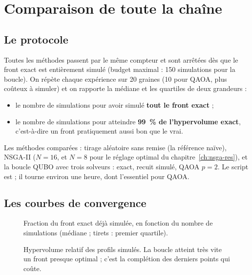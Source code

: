 \chapter{Comparaison de toute la chaîne}\label{ch:comparaison}

\section{Le protocole}
Toutes les méthodes passent par le même compteur et sont arrêtées dès que le front exact est entièrement simulé (budget maximal : 150 simulations pour la boucle). On répète chaque expérience sur 20 graines (10 pour QAOA, plus coûteux à simuler) et on rapporte la médiane et les quartiles de deux grandeurs :
\begin{itemize}
\item le nombre de simulations pour avoir simulé \textbf{tout le front exact} ;
\item le nombre de simulations pour atteindre \textbf{99~\% de l'hypervolume exact}, c'est-à-dire un front pratiquement aussi bon que le vrai.
\end{itemize}
Les méthodes comparées : tirage aléatoire sans remise (la référence naïve), NSGA-II ($N=16$, et $N=8$ pour le réglage optimal du chapitre~\ref{ch:nsga-res}), et la boucle QUBO avec trois solveurs : exact, recuit simulé, QAOA $p=2$. Le script est  ; il tourne environ une heure, dont l'essentiel pour QAOA.

\section{Les courbes de convergence}
\begin{figure}[htbp]
\centering

\caption{Fraction du front exact déjà simulée, en fonction du nombre de simulations (médiane ; tirets : premier quartile).}\label{fig:conv-front}
\end{figure}

\begin{figure}[htbp]
\centering

\caption{Hypervolume relatif des profils simulés. La boucle atteint très vite un front presque optimal ; c'est la complétion des derniers points qui coûte.}\label{fig:conv-hv}
\end{figure}

